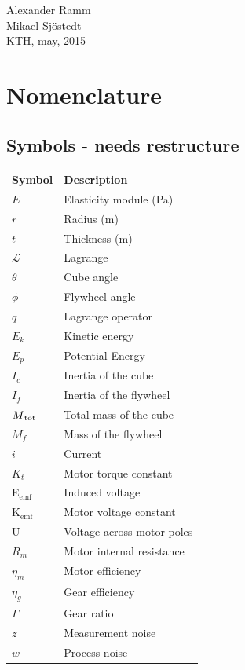 \documentclass[a4paper,11pt]{kth-mag}
\newcommand{\textunderscript}[1]{$_{\text{#1}}$}
\begin{document}
\begin{flushright}Alexander Ramm \\Mikael Sjöstedt \\ KTH, may, 2015 \end{flushright}
 



\cleardoublepage
{}
\printindex
\tableofcontents*

\cleardoublepage
\chapter*{Nomenclature}
\section*{Symbols - needs restructure}
\noindent{}\begin{tabular}{@{}p{2.5cm}l}
\textbf{Symbol} 	& \textbf{Description} \vspace{.5em} \\
$E$ 		& Elasticity module (Pa) \\
$r$		& Radius (m) \\
$t$		& Thickness (m) \\
$\mathcal{L}$			& Lagrange \\
$\theta$		& Cube angle\\
$\phi$		& Flywheel angle \\
$q$			& Lagrange operator \\
$E_k	$		& Kinetic energy \\
$E_p$		& Potential Energy \\
$I_c$		& Inertia of the cube\\
$I_f$		& Inertia of the flywheel\\
$M\textsubscript{tot}$		& Total mass of the cube\\
$M_f$		& Mass of the flywheel \\
$i$			& Current\\
$K_t$		& Motor torque constant\\
E\textunderscript{emf} 	& Induced voltage \\
K\textunderscript{emf} 	& Motor voltage constant \\
U			& Voltage across motor poles\\
$R_m	$		& Motor internal resistance \\
$\eta_m$		& Motor efficiency\\	
$\eta_g$		& Gear efficiency \\
$\Gamma$		& Gear ratio\\
$z$			& Measurement noise \\
$w$			& Process noise \\

\end{tabular}
\clearpage
\end{document}
